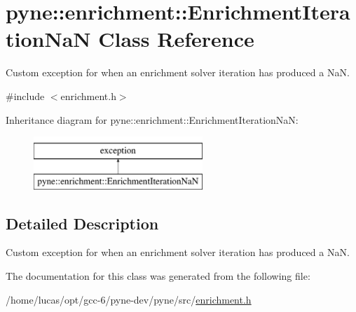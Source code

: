 \hypertarget{classpyne_1_1enrichment_1_1_enrichment_iteration_na_n}{}\section{pyne\+:\+:enrichment\+:\+:Enrichment\+Iteration\+NaN Class Reference}
\label{classpyne_1_1enrichment_1_1_enrichment_iteration_na_n}


Custom exception for when an enrichment solver iteration has produced a NaN.  




{\ttfamily \#include $<$enrichment.\+h$>$}

Inheritance diagram for pyne\+:\+:enrichment\+:\+:Enrichment\+Iteration\+NaN\+:\begin{figure}[H]
\begin{center}
\leavevmode
\includegraphics[height=2.000000cm]{classpyne_1_1enrichment_1_1_enrichment_iteration_na_n}
\end{center}
\end{figure}


\subsection{Detailed Description}
Custom exception for when an enrichment solver iteration has produced a NaN. 

The documentation for this class was generated from the following file\+:\begin{DoxyCompactItemize}
\item 
/home/lucas/opt/gcc-\/6/pyne-\/dev/pyne/src/\hyperlink{enrichment_8h}{enrichment.\+h}\end{DoxyCompactItemize}

